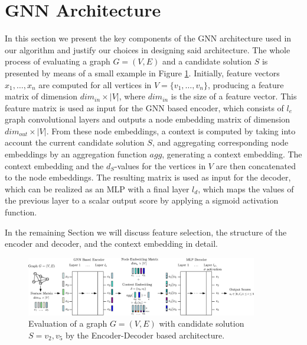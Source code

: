 \documentclass[draft,final]{vutinfth} %
\begin{document}
\section{GNN Architecture}\label{sec:gnn-architecture}
In this section we present the key components of the GNN architecture used in our algorithm and justify our choices in designing said architecture. 
The whole process of evaluating a graph $G = (V, E)$ and a candidate solution $S$ is presented by means of a small example in Figure \ref{fig:gnn-architecture}. 
Initially, feature vectors $x_1, \dots, x_n$ are computed for all vertices in $V = \{v_1, \dots, v_n\}$, producing a feature matrix of dimension $\mathit{dim_{in}} \times |V|$, where $\mathit{dim_{in}}$ is the size of a feature vector. This feature matrix is used as input for the GNN based encoder, which consists of $l_e$ graph convolutional layers and outputs a node embedding matrix of dimension $\mathit{dim_{out}} \times |V|$. From these node embeddings, a context is computed by taking into account the current candidate solution $S$, and aggregating corresponding node embeddings by an aggregation function $\mathit{agg}$, generating a context embedding. The context embedding and the $d_S$-values for the vertices in $V$ are then concatenated to the node embeddings. The resulting matrix is used as input for the decoder, which can be realized as an MLP with a final layer $l_d$, which maps the values of the previous layer to a scalar output score by applying a sigmoid activation function. 

In the remaining Section we will discuss feature selection, the structure of the encoder and decoder, and the context embedding in detail. 

\begin{figure}
    \centering
    \includegraphics[width=0.9\textwidth]{graphics/gnn-architecture.eps}
    \caption{Evaluation of a graph $G = (V, E)$ with candidate solution $S = {v_2, v_5}$ by the Encoder-Decoder based architecture. }
    \label{fig:gnn-architecture}
\end{figure}
\end{document}
